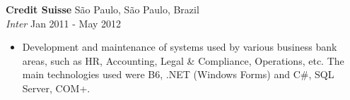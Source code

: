 \documentclass[a4paper]{article}
\begin{document}
\textbf{Credit Suisse} \hfill São Paulo, São Paulo, Brazil\\
\textit{Inter} \hfill Jan 2011 - May 2012\\
\vspace{-1mm}
\begin{itemize} \itemsep 1pt
	\item Development and maintenance of systems used by various business bank areas, such as HR, Accounting, Legal \& Compliance, Operations, etc. The main technologies used were B6, .NET (Windows Forms) and C\#, SQL Server, COM+.
\end{itemize}







\ 
\end{document}
